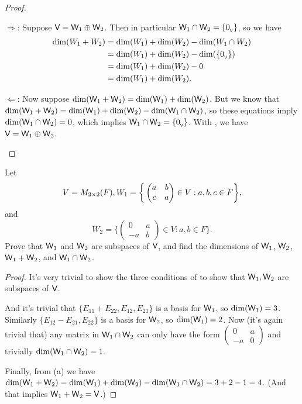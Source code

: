 \begin{proof}
\begin{enumerate}
\(\Longrightarrow\):
Suppose \(\textsf{V} = \textsf{W}_1 \oplus \textsf{W}_2\).
Then in particular \(\textsf{W}_1 \cap \textsf{W}_2 = \{ 0_{_{\textsf{V}}} \}\), so we have
\begin{align*}
    \dim(W_1 + W_2) & = \dim(W_1) + \dim(W_2) - \dim(W_1 \cap W_2) \\
                    & = \dim(W_1) + \dim(W_2) - \dim(\{ 0_{_{\textsf{V}}} \}) \\
                    & = \dim(W_1) + \dim(W_2) - 0 \\
                    & = \dim(W_1) + \dim(W_2).
\end{align*}

\(\Longleftarrow\):
Now suppose \(\dim(\textsf{W}_1 + \textsf{W}_2) = \dim(\textsf{W}_1) + \dim(\textsf{W}_2)\).
But we know that \(\dim(\textsf{W}_1 + \textsf{W}_2) = \dim(\textsf{W}_1) + \dim(\textsf{W}_2) - \dim(\textsf{W}_1 \cap \textsf{W}_2)\), so these equations imply \(\dim(\textsf{W}_1 \cap \textsf{W}_2) = 0\), which implies \(\textsf{W}_1 \cap \textsf{W}_2 = \{ 0_{_{\textsf{V}}} \}\).
With , we have \(\textsf{V} = \textsf{W}_1 \oplus \textsf{W}_2\).
\end{enumerate}
\end{proof}

\begin{exercise} \label{exercise 1.6.30}
Let
\[
    V = M_{2 \times 2}(F),
    W_1 = \bigg\{
        \begin{pmatrix}
            a & b \\
            c & a
        \end{pmatrix}
        \in V: a, b, c \in F
        \bigg\},
\]
and
\[
    W_2 = \bigg\{
        \begin{pmatrix}
            0 & a \\
            -a & b
        \end{pmatrix}
        \in V: a, b \in F
        \bigg\}.
\]
Prove that \(\textsf{W}_1\) and \(\textsf{W}_2\) are subspaces of \(\textsf{V}\), and find the dimensions of \(\textsf{W}_1\), \(\textsf{W}_2\), \(\textsf{W}_1 + \textsf{W}_2\), and \(\textsf{W}_1 \cap \textsf{W}_2\).
\end{exercise}

\begin{proof}
It's very trivial to show the three conditions of  to show that \(\textsf{W}_1, \textsf{W}_2\) are subspaces of \(\textsf{V}\).

And it's trivial that \(\{ E_{11} + E_{22}, E_{12}, E_{21} \}\) is a basis for \(\textsf{W}_1\), so \(\dim(\textsf{W}_1) = 3\).
Similarly \(\{ E_{12} - E_{21}, E_{22} \}\) is a basis for \(\textsf{W}_2\), so \(\dim(\textsf{W}_1) = 2\).
Now (it's again trivial that) any matrix in \(\textsf{W}_1 \cap \textsf{W}_2\) can only have the form
\(\begin{pmatrix}
    0 & a \\
    -a & 0
\end{pmatrix}\)
and trivially \(\dim(\textsf{W}_1 \cap \textsf{W}_2) = 1\).

Finally, from (a) we have \(\dim(\textsf{W}_1 + \textsf{W}_2) = \dim(\textsf{W}_1) + \dim(\textsf{W}_2) - \dim(\textsf{W}_1 \cap \textsf{W}_2) = 3 + 2 - 1 = 4\).
(And that implies \(\textsf{W}_1 + \textsf{W}_2 = \textsf{V}\).)
\end{proof}

